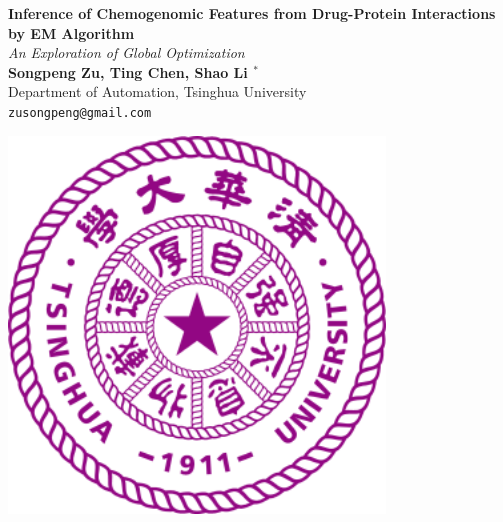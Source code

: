 \documentclass[a0,portrait]{a0poster}
\begin{document}


\begin{minipage}[b]{0.75\linewidth}
\veryHuge \color{NavyBlue} \textbf{Inference of Chemogenomic Features from Drug-Protein Interactions by EM Algorithm} \color{Black}\\ %
\Huge\textit{An Exploration of Global Optimization}\\[2cm] %
\huge \textbf{Songpeng Zu, Ting Chen, Shao Li $^{*}$}\\[0.5cm] %
\huge Department of Automation, Tsinghua University\\[0.4cm] %
\Large \texttt{zusongpeng@gmail.com}\\
\end{minipage}
\begin{minipage}[b]{0.25\linewidth}
\includegraphics[width=10cm]{tsinghualogo.png}\\
\end{minipage}

\vspace{1cm} %
\end{document}
